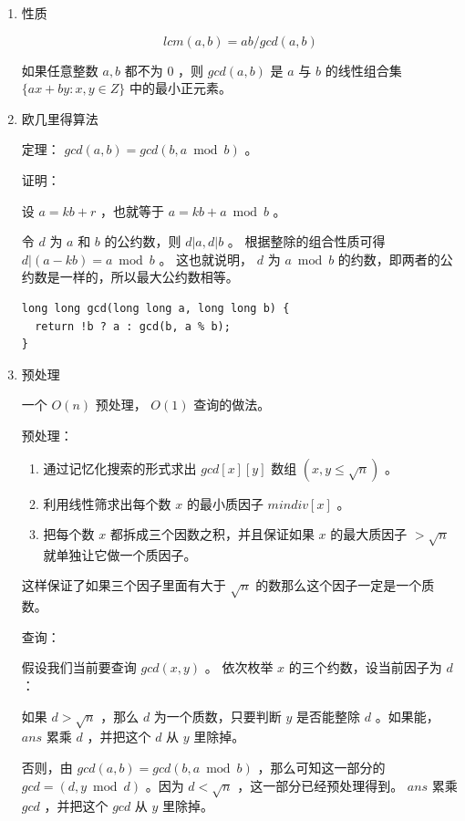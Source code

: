 \documentclass[11pt]{article}
\begin{document}
\begin{enumerate}
\item 性质
\label{sec-3-3-1-1}

$$
lcm(a,b) = ab/gcd(a,b)
$$

如果任意整数 $a,b$ 都不为 $0$  ，则 $gcd(a,b)$ 是 $a$ 与 $b$ 的线性组合集 $\{ax+by:x,y \in Z\}$ 中的最小正元素。

\item 欧几里得算法
\label{sec-3-3-1-2}

定理： $gcd(a, b) = gcd(b, a \bmod b)$ 。

证明：

设 $a = kb + r$  ，也就等于 $a = kb + a \bmod b$  。

令 $d$ 为 $a$ 和 $b$ 的公约数，则 $d|a,d|b$ 。 根据整除的组合性质可得 $d|(a-kb)=a \bmod b$  。
这也就说明， $d$ 为 $a \bmod b$ 的约数，即两者的公约数是一样的，所以最大公约数相等。

\begin{verbatim}
long long gcd(long long a, long long b) {
  return !b ? a : gcd(b, a % b);
}
\end{verbatim}

\item 预处理
\label{sec-3-3-1-3}

一个 $O(n)$ 预处理， $O(1)$ 查询的做法。

预处理：

\begin{enumerate}
\item 通过记忆化搜索的形式求出 $gcd[x][y]$ 数组 $(x,y \leq\sqrt{n})$ 。

\item 利用线性筛求出每个数 $x$ 的最小质因子 $mindiv[x]$ 。

\item 把每个数 $x$ 都拆成三个因数之积，并且保证如果 $x$ 的最大质因子 $> \sqrt{n}$ 就单独让它做一个质因子。
\end{enumerate}

这样保证了如果三个因子里面有大于 $\sqrt{n}$ 的数那么这个因子一定是一个质数。

查询：

假设我们当前要查询 $gcd(x,y)$ 。 依次枚举 $x$ 的三个约数，设当前因子为 $d$  ：

如果 $d>\sqrt{n}$ ，那么 $d$ 为一个质数，只要判断 $y$ 是否能整除 $d$ 。如果能， $ans$ 累乘 $d$ ，并把这个 $d$ 从 $y$ 里除掉。

否则，由 $gcd(a,b)=gcd(b,a \bmod b)$ ，那么可知这一部分的 $gcd=(d,y \bmod d)$ 。因为 $d<\sqrt{n}$ ，这一部分已经预处理得到。 $ans$ 累乘 $gcd$ ，并把这个 $gcd$ 从 $y$ 里除掉。


\end{enumerate}
\end{document}
